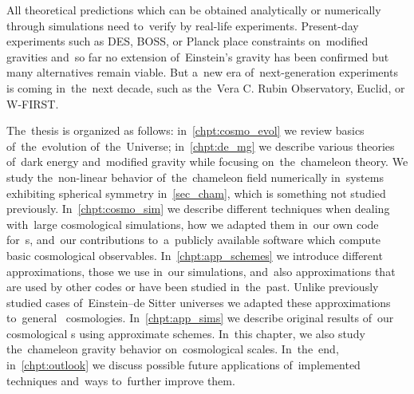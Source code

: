 All theoretical predictions which can be obtained analytically or numerically through simulations need to~verify by real-life experiments. Present-day experiments such as DES, BOSS, or Planck place constraints on~modified gravities and~so far no extension of~Einstein's gravity has been confirmed but many alternatives remain viable. But a~new era of~next-generation experiments is coming in~the~next decade, such as the~Vera C. Rubin Observatory, Euclid, or W-FIRST.


The~thesis is organized as follows: in~\autoref{chpt:cosmo_evol} we review basics of~the~evolution of~the~Universe; in~\autoref{chpt:de_mg} we describe various theories of~dark energy and~modified gravity while focusing on~the~chameleon theory. We study the~non-linear behavior of~the~chameleon field numerically in~systems exhibiting spherical symmetry in~\autoref{sec_cham}, which is something not studied previously. In~\autoref{chpt:cosmo_sim} we describe different techniques when dealing with~large cosmological simulations, how we adapted them in~our own code for~\nbodysim s, and~our contributions to~a~publicly available software  which compute basic cosmological observables. In~\autoref{chpt:app_schemes} we introduce different approximations, those we use in~our simulations, and~also approximations that are used by other codes or have been studied in~the~past. Unlike previously studied cases of~Einstein--de Sitter universes we adapted these approximations to~general \LCDM\ cosmologies. In~\autoref{chpt:app_sims} we describe original results of~our cosmological \nbodysim s using approximate schemes. In~this chapter, we also study the~chameleon gravity behavior on~cosmological scales. 
In~the~end, in~\autoref{chpt:outlook} we discuss possible future applications of~implemented techniques and~ways to~further improve them.

